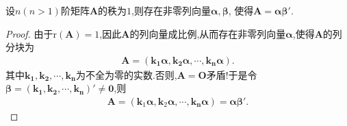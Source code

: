 \documentclass[../../main.tex]{subfiles}
\begin{document}
\begin{lemma}[秩1矩阵的列向量分解]\label{lemma:秩1矩阵的列向量分解}
设\(n(n > 1)\)阶矩阵\(\boldsymbol{A}\)的秩为\(1\),则存在非零列向量\(\boldsymbol{\alpha},\boldsymbol{\beta}\), 使得\(\boldsymbol{A} = \boldsymbol{\alpha}\boldsymbol{\beta}'\).
\end{lemma}
\begin{proof}
由于$\mathrm{r}(\boldsymbol{A}) = 1$,因此$\boldsymbol{A}$的列向量成比例,从而存在非零列向量$\boldsymbol{\alpha }$,使得$\boldsymbol{A}$的列分块为
\begin{align*}
\boldsymbol{A}=\left( \boldsymbol{k}_{\mathbf{1}}\boldsymbol{\alpha },\boldsymbol{k}_{\mathbf{2}}\boldsymbol{\alpha },\cdots ,\boldsymbol{k}_{\boldsymbol{n}}\boldsymbol{\alpha } \right)  .
\end{align*}
其中$\boldsymbol{k}_{\mathbf{1}},\boldsymbol{k}_{\mathbf{2}},\cdots ,\boldsymbol{k}_{\boldsymbol{n}}$为不全为零的实数.否则,$\boldsymbol{A}=\boldsymbol{O}$矛盾!于是令$\boldsymbol{\beta }=\left( \boldsymbol{k}_{\mathbf{1}},\boldsymbol{k}_{\mathbf{2}},\cdots ,\boldsymbol{k}_{\boldsymbol{n}} \right)'\ne \mathbf{0}$,则
\begin{align*}
\boldsymbol{A}=\left( \boldsymbol{k}_1\boldsymbol{\alpha },\boldsymbol{k}_2\boldsymbol{\alpha },\cdots ,\boldsymbol{k}_{\boldsymbol{n}}\boldsymbol{\alpha } \right) =\boldsymbol{\alpha \beta }' .
\end{align*}
\end{proof}
\end{document}

